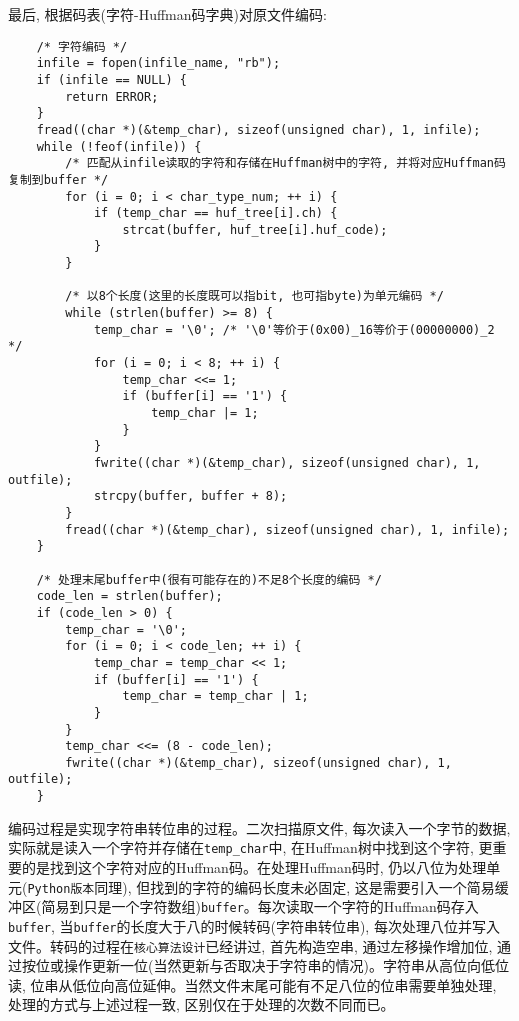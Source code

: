 \documentclass[a4paper]{ctexart}
\begin{document}
最后, 根据码表(字符-Huffman码字典)对原文件编码:

{\setmainfont{Courier New Bold}              
\begin{lstlisting}
    /* 字符编码 */
    infile = fopen(infile_name, "rb");
    if (infile == NULL) {
        return ERROR;
    }
    fread((char *)(&temp_char), sizeof(unsigned char), 1, infile);
    while (!feof(infile)) {
        /* 匹配从infile读取的字符和存储在Huffman树中的字符, 并将对应Huffman码复制到buffer */
        for (i = 0; i < char_type_num; ++ i) {
            if (temp_char == huf_tree[i].ch) {
                strcat(buffer, huf_tree[i].huf_code);
            }
        }

        /* 以8个长度(这里的长度既可以指bit, 也可指byte)为单元编码 */
        while (strlen(buffer) >= 8) {
            temp_char = '\0'; /* '\0'等价于(0x00)_16等价于(00000000)_2 */
            for (i = 0; i < 8; ++ i) {
                temp_char <<= 1;
                if (buffer[i] == '1') {
                    temp_char |= 1;
                }
            }
            fwrite((char *)(&temp_char), sizeof(unsigned char), 1, outfile);
            strcpy(buffer, buffer + 8);
        }
        fread((char *)(&temp_char), sizeof(unsigned char), 1, infile);
    }
        
    /* 处理末尾buffer中(很有可能存在的)不足8个长度的编码 */
    code_len = strlen(buffer);
    if (code_len > 0) {
        temp_char = '\0';
        for (i = 0; i < code_len; ++ i) {
            temp_char = temp_char << 1;
            if (buffer[i] == '1') {
                temp_char = temp_char | 1;
            }
        }
        temp_char <<= (8 - code_len);
        fwrite((char *)(&temp_char), sizeof(unsigned char), 1, outfile);
    }
\end{lstlisting}}

编码过程是实现字符串转位串的过程。二次扫描原文件, 每次读入一个字节的数据, 实际就是读入一个字符并存储在\texttt{temp\_char}中, 在Huffman树中找到这个字符, 更重要的是找到这个字符对应的Huffman码。在处理Huffman码时, 仍以八位为处理单元(\texttt{Python版本}同理), 但找到的字符的编码长度未必固定,
这是需要引入一个简易缓冲区(简易到只是一个字符数组)\texttt{buffer}。每次读取一个字符的Huffman码存入\texttt{buffer}, 当\texttt{buffer}的长度大于八的时候转码(字符串转位串), 每次处理八位并写入文件。转码的过程在\texttt{核心算法设计}已经讲过, 首先构造空串, 通过左移操作增加位, 通过按位或操作更新一位(当然更新与否取决于字符串的情况)。字符串从高位向低位读, 位串从低位向高位延伸。当然文件末尾可能有不足八位的位串需要单独处理, 处理的方式与上述过程一致, 区别仅在于处理的次数不同而已。
\end{document}
